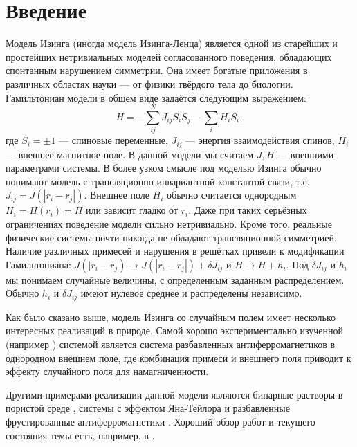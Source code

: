 \section{Введение}
	Модель Изинга (иногда модель Изинга-Ленца)  является одной из старейших и простейших нетривиальных моделей согласованного поведения, обладающих спонтанным нарушением симметрии. Она имеет богатые приложения в различных областях науки –– от физики твёрдого тела до биологии. Гамильтониан модели в общем виде задаётся следующим выражением:
	\begin{equation}
		H = - \sum_{ij}^N J_{ij}	S_i S_j - \sum_{i} H_i S_i,
	\end{equation}
	где $S_i = \pm 1$ –– спиновые переменные, $J_{ij}$ –– энергия взаимодействия спинов, $H_i$ –– внешнее магнитное поле. В данной модели мы считаем $J,H$ –– внешними параметрами системы. В более узком смысле под моделью Изинга обычно понимают модель с трансляционно-инвариантной константой связи, т.е. $J_{ij} = J(|r_i - r_j|)$.
	 Внешнее поле $H_i$ обычно считается однородным $H_i = H(r_i) = H$ или зависит гладко от $r_i$.
	 Даже при таких серьёзных ограничениях поведение модели сильно нетривиально. Кроме того,  реальные физические системы почти никогда не обладают трансляционной симметрией.
	 Наличие различных примесей и нарушения в решётках привели к модификации Гамильтониана: $J(|r_i-r_j) \to J(|r_i-r_j|) + \delta J_{ij}$ и $H \to H + h_i$. Под $\delta J_{ij}$ и $h_i$  мы понимаем случайные величины, с определенным заданным распределением. Обычно $h_i$ и $\delta J_{ij}$ имеют нулевое среднее и распределены независимо.

	Как было сказано выше, модель Изинга со случайным полем имеет несколько интересных реализаций в природе. Самой хорошо экспериментально изученной (например \cite{fishman}) системой является система разбавленных антиферромагнетиков  в однородном внешнем поле, где комбинация примеси и внешнего поля приводит к эффекту случайного поля для намагниченности.

	Другими примерами реализации данной модели являются бинарные растворы в пористой среде \cite{de1984liquid}, системы с эффектом Яна-Тейлора \cite{graham1987random} и разбавленные фрустированные антиферромагнетики \cite{fernandez1988random}. Хороший обзор работ и текущего состояния темы есть, например, в \cite{nattermann1998theory}.
	
